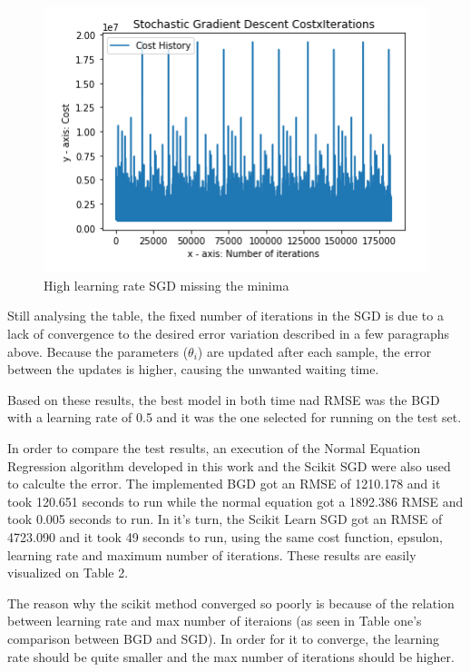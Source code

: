 \documentclass[conference]{IEEEtran}
\begin{document}
	  \begin{figure}[!h]
      \centering
      \includegraphics[width=1\columnwidth]{images/sgd_high_learning_rate.png}
      \caption{High learning rate SGD missing the minima}
      \label{fig3}
  \end{figure}
	
	Still analysing the table, the fixed number of iterations in the SGD is due to a lack of convergence to the desired error variation described in a few paragraphs above. Because the parameters ($\theta_i$) are updated after each sample, the error between the updates is higher, causing the unwanted waiting time.
	
	Based on these results, the best model in both time nad RMSE was the BGD with a learning rate of 0.5 and it was the one selected for running on the test set.

	In order to compare the test results, an execution of the Normal Equation Regression algorithm developed in this work and the Scikit SGD were also used to calculte the error. The  implemented BGD got an RMSE of 1210.178 and it took 120.651 seconds to run while the normal equation got a 1892.386 RMSE and took 0.005 seconds to run. In it's turn, the Scikit Learn SGD got an RMSE of 4723.090 and it took 49 seconds to run, using the same cost function, epsulon, learning rate and maximum number of iterations. These results are easily visualized on Table 2.
	
	The reason why the scikit method converged so poorly is because of the relation between learning rate and max number of iteraions (as seen in Table one's comparison between BGD and SGD). In order for it to converge, the learning rate should be quite smaller and the max number of iterations should be higher.
	
\end{document}
